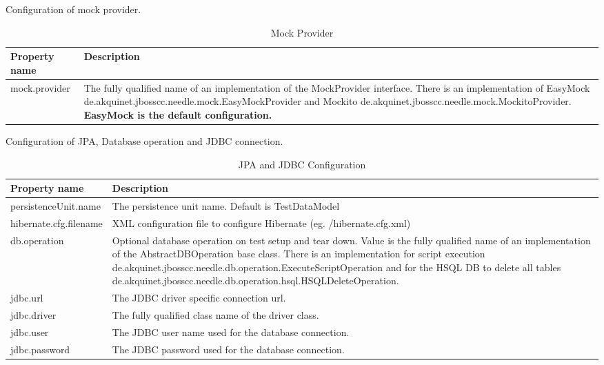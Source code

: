 \parskip 14pt
\parindent 0pt
Configuration of mock provider.

\begin{table}[H]
\centering
\begin{tabular}{p{6cm}p{11cm}} \toprule
    \textbf{Property name} & \textbf{Description} \\ \midrule
    mock.provider & The fully qualified name of an implementation of the MockProvider interface. There is an implementation of EasyMock de.akquinet.jbosscc.needle.mock.EasyMockProvider and Mockito de.akquinet.jbosscc.needle.mock.MockitoProvider. \textbf{EasyMock is the default configuration.}  \\
\bottomrule
\end{tabular}
\caption{Mock Provider}
\end{table}


\parskip 14pt
\parindent 0pt
Configuration of JPA, Database operation and JDBC connection.

\begin{table}[H]
\centering
\begin{tabular}{p{6cm}p{11cm}} \toprule
    \textbf{Property name} & \textbf{Description} \\ \midrule
    persistenceUnit.name & The persistence unit name. Default is TestDataModel  \\
    hibernate.cfg.filename & XML configuration file to configure Hibernate (eg. /hibernate.cfg.xml)  \\
    db.operation & Optional database operation on test setup and tear down. Value is the fully qualified name of an implementation of the AbstractDBOperation base class.
There is an implementation for script execution de.akquinet.jbosscc.needle.db.operation.\-ExecuteScriptOperation and for the  HSQL DB to delete all tables de.akquinet.jbosscc.needle.db.operation.hsql.\-HSQLDeleteOperation.    \\
    jdbc.url & The JDBC driver specific connection url.  \\
    jdbc.driver & The fully qualified class name of the driver class.  \\
    jdbc.user &  The JDBC user name used for the database connection.  \\
    jdbc.password & The JDBC password used for the database connection.  \\
\bottomrule
\end{tabular}
\caption{JPA and JDBC Configuration}
\end{table}

